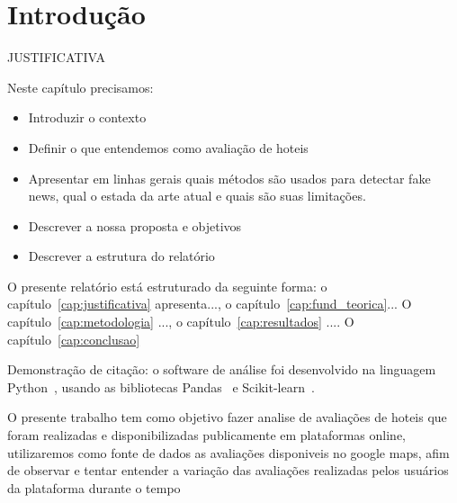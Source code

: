 
\chapter[Introdução]{Introdução}
\label{cap:intro}

JUSTIFICATIVA

Neste capítulo precisamos:
\begin{itemize}
    \item Introduzir o contexto
    \item Definir o que entendemos como avaliação de hoteis
    \item Apresentar em linhas gerais quais métodos são usados para detectar fake news, qual o estada da arte atual e quais são suas limitações.
    \item Descrever a nossa proposta e objetivos
    \item Descrever a estrutura do relatório
\end{itemize}

O presente relatório está estruturado da seguinte forma: o capítulo~\ref{cap:justificativa} apresenta..., o capítulo~\ref{cap:fund_teorica}... O capítulo~\ref{cap:metodologia} ..., o capítulo~\ref{cap:resultados} .... O capítulo~\ref{cap:conclusao} 

Demonstração de citação: o software de análise foi desenvolvido na linguagem Python~\cite{van1995python}, usando as bibliotecas Pandas~\cite{mckinney2010data} e Scikit-learn~\cite{scikit-learn}.

O presente trabalho tem como objetivo fazer analise de avaliações de hoteis que foram realizadas e disponibilizadas publicamente em plataformas online, utilizaremos como fonte de dados as avaliações disponiveis no google maps, afim de observar e tentar entender a variação das avaliações realizadas pelos usuários da plataforma durante o tempo